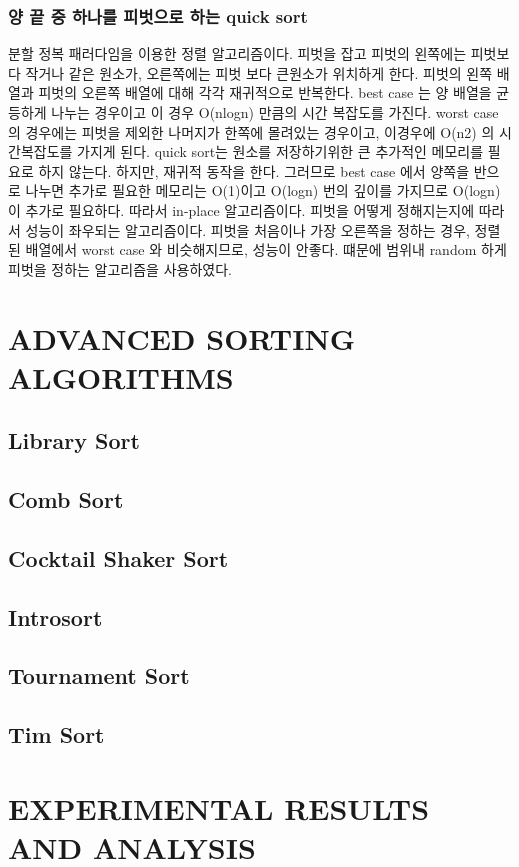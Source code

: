 \documentclass[sigconf]{acmart}
\begin{document}
\subsubsection{양 끝 중 하나를 피벗으로 하는 quick sort}
분할 정복 패러다임을 이용한 정렬 알고리즘이다. 피벗을 잡고 피벗의 왼쪽에는 피벗보다 작거나 같은 원소가, 오른쪽에는 피벗 보다 큰원소가 위치하게 한다. 피벗의 왼쪽 배열과 피벗의 오른쪽 배열에 대해 각각 재귀적으로 반복한다. best case 는  양 배열을 균등하게 나누는 경우이고 이 경우 O(nlogn) 만큼의 시간 복잡도를 가진다. worst case 의 경우에는 피벗을 제외한 나머지가 한쪽에 몰려있는 경우이고, 이경우에 O(n2) 의 시간복잡도를 가지게 된다.
quick sort는 원소를 저장하기위한 큰 추가적인 메모리를 필요로 하지 않는다. 하지만, 재귀적 동작을 한다. 그러므로 best case 에서 양쪽을 반으로 나누면 추가로 필요한 메모리는 O(1)이고 O(logn) 번의 깊이를 가지므로 O(logn) 이 추가로 필요하다. 따라서 in-place 알고리즘이다.
피벗을 어떻게 정해지는지에 따라서 성능이 좌우되는 알고리즘이다. 피벗을 처음이나 가장 오른쪽을 정하는 경우, 정렬된 배열에서 worst case 와 비슷해지므로, 성능이 안좋다. 떄문에 범위내 random 하게 피벗을 정하는 알고리즘을 사용하였다.

\section{ADVANCED SORTING ALGORITHMS}
\subsection{Library Sort}
\subsection{Comb Sort}
\subsection{Cocktail Shaker Sort}
\subsection{Introsort}
\subsection{Tournament Sort}
\subsection{Tim Sort}
\section{EXPERIMENTAL RESULTS AND ANALYSIS}
\end{document}
